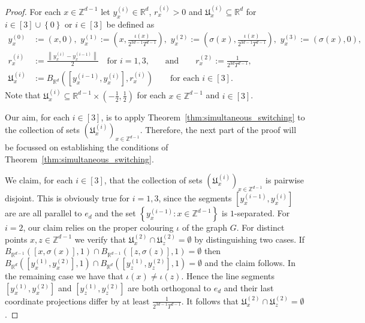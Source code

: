 \documentclass[a4paper, bibliography=totoc]{scrartcl}
\numberwithin{claimcounter}{define}
\newcommand{\R}{\mathbb{R}}
\newcommand{\Z}{\mathbb{Z}}
\newcommand{\enorm}[1]{\left\|#1\right\|}
\newcommand{\mf}[1]{\mathfrak{#1}}
\newcommand{\set}[1]{\left\{#1\right\}}
\newcommand{\br}[1]{\left(#1\right)}
\newcommand{\sqbr}[1]{\left[#1\right]}
\newcommand{\upp}[1]{^{(#1)}}
\begin{document}
\begin{proof}
	For each $x\in \Z^{d-1}$ let $y_{x}\upp{i}\in\R^{d}$, $r_{x}\upp{i}>0$ and $\mf{U}_{x}\upp{i}\subseteq \R^{d}$ for $i\in[3]\cup\set{0}$ or $i\in[3]$ be defined as 
	\begin{align*}
	y_{x}\upp{0}&:=(x,0),\,\, y_{x}\upp{1}:=\br{x,\frac{\iota(x)}{2^{3d-1}T^{d-1}}},\,\, y_{x}\upp{2}:=\br{\sigma(x),\frac{\iota(x)}{2^{3d-1}T^{d-1}}},\,\, y_{x}\upp{3}:=\br{\sigma(x),0},\\
	r_{x}\upp{i}&:=\frac{\enorm{y_{x}\upp{i}-y_{x}\upp{i-1}}}{2}\quad\text{for $i=1,3$,}\qquad \text{and}\qquad r_{x}\upp{2}:=\frac{1}{2^{3d}T^{d-1}},\\
	\mf{U}_{x}\upp{i}&:=B_{\R^{d}}\br{\sqbr{y_{x}\upp{i-1},y_{x}\upp{i}},r_{x}\upp{i}} \qquad \text{for each $i\in[3]$.}
	\end{align*}
	Note that $\mf{U}_{x}\upp{i}\subseteq \R^{d-1}\times\br{-\frac{1}{2},\frac{1}{2}}$ for each $x\in\Z^{d-1}$ and $i\in[3]$.
	
	Our aim, for each $i\in [3]$, is to apply Theorem~\ref{thm:simultaneous_switching} to the collection of sets $(\mf{U}_{x}\upp{i})_{x\in\Z^{d-1}}$. Therefore, the next part of the proof will be focussed on establishing the conditions of Theorem~\ref{thm:simultaneous_switching}. 
	
	We claim, for each $i\in[3]$, that the collection of sets $(\mf{U}_{x}\upp{i})_{x\in \Z^{d-1}}$ is pairwise disjoint. This is obviously true for $i=1,3$, since the segments $\sqbr{y_{x}\upp{i-1},y_{x}\upp{i}}$ are are all parallel to $e_{d}$ and the set $\set{y_{x}\upp{i-1}\colon x\in\Z^{d-1}}$ is $1$-separated. For $i=2$, our claim relies on the proper colouring $\iota$ of the graph $G$. For distinct points $x,z\in\Z^{d-1}$ we verify that $\mf{U}_{x}\upp{2}\cap \mf{U}_{z}\upp{2}=\emptyset$ by distinguishing two cases. If $B_{\R^{d-1}}([x,\sigma(x)],1)\cap B_{\R^{d-1}}([z,\sigma(z)],1)=\emptyset$ then $B_{\R^{d}}\br{\sqbr{y_{x}\upp{1},y_{x}\upp{2}},1}\cap B_{\R^{d}}\br{\sqbr{y_{z}\upp{1},y_{z}\upp{2}},1}=\emptyset$ and the claim follows. In the remaining case we have that $\iota(x)\neq \iota(z)$. Hence the line segments $\sqbr{y_{x}\upp{1},y_{x}\upp{2}}$ and $\sqbr{y_{z}\upp{1},y_{z}\upp{2}}$ are both orthogonal to $e_{d}$ and their last coordinate projections differ by at least $\frac{1}{2^{3d-1}T^{d-1}}$. It follows that $\mf{U}_{x}\upp{2}\cap \mf{U}_{z}\upp{2}=\emptyset$.  
	

\end{proof}
\end{document}
